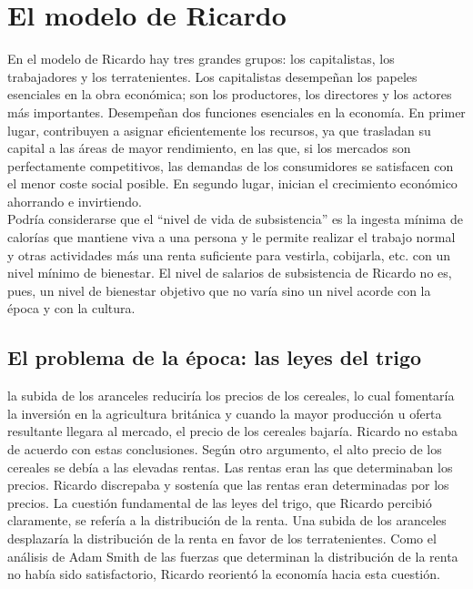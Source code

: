 \documentclass[10pt]{book}
\begin{document}
\section*{El modelo de Ricardo}
En el modelo de Ricardo hay tres grandes grupos: los capitalistas, los trabajadores y los terratenientes. Los capitalistas desempeñan los papeles esenciales en la obra económica; son los productores, los directores y los actores más importantes. Desempeñan dos funciones esenciales en la economía. En primer lugar, contribuyen a asignar eficientemente los recursos, ya que trasladan su capital a las áreas de mayor rendimiento, en las que, si los mercados son perfectamente competitivos, las demandas de los consumidores se satisfacen con el menor coste social posible. En segundo lugar, inician el crecimiento económico ahorrando e invirtiendo.\\
Podría considerarse que el “nivel de vida de subsistencia” es la ingesta mínima de calorías que mantiene viva a una persona y le permite realizar el trabajo normal y otras actividades más una renta suficiente para vestirla, cobijarla, etc. con un nivel mínimo de bienestar. El nivel de salarios de subsistencia de Ricardo no es, pues, un nivel de bienestar objetivo que no varía sino un nivel acorde con la época y con la cultura. \\

\subsection*{El problema de la época: las leyes del trigo}
la subida de los aranceles reduciría los precios de los cereales, lo cual fomentaría la inversión en la agricultura británica y cuando la mayor producción u oferta resultante llegara al mercado, el precio de los cereales bajaría. Ricardo no estaba de acuerdo con estas conclusiones. Según otro argumento, el alto precio de los cereales se debía a las elevadas rentas. Las rentas eran las que determinaban los precios. Ricardo discrepaba y sostenía que las rentas eran determinadas por los precios. La cuestión fundamental de las leyes del trigo, que Ricardo percibió claramente, se refería a la distribución de la renta. Una subida de los aranceles desplazaría la distribución de la renta en favor de los terratenientes. Como el análisis de Adam Smith de las fuerzas que determinan la distribución de la renta no había sido satisfactorio, Ricardo reorientó la economía hacia esta cuestión.
\end{document}
